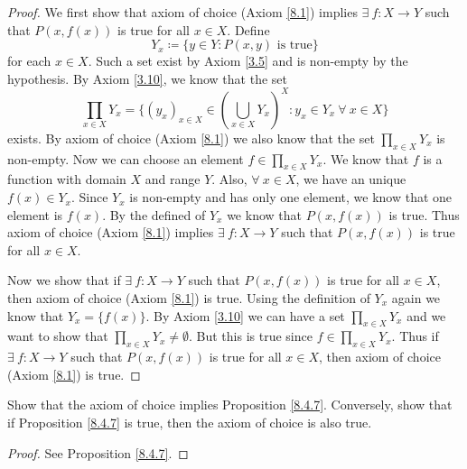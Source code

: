 \begin{proof}
    We first show that axiom of choice (Axiom \ref{8.1}) implies \(\exists\ f : X \to Y\) such that \(P(x, f(x))\) is true for all \(x \in X\).
    Define
    \[
        Y_x \coloneqq \{y \in Y : P(x, y) \text{ is true}\}
    \]
    for each \(x \in X\).
    Such a set exist by Axiom \ref{3.5} and is non-empty by the hypothesis.
    By Axiom \ref{3.10}, we know that the set
    \[
        \prod_{x \in X} Y_x = \Bigg\{(y_x)_{x \in X} \in (\bigcup_{x \in X} Y_x)^X : y_x \in Y_x \ \forall\ x \in X\Bigg\}
    \]
    exists.
    By axiom of choice (Axiom \ref{8.1}) we also know that the set \(\prod_{x \in X} Y_x\) is non-empty.
    Now we can choose an element \(f \in \prod_{x \in X} Y_x\).
    We know that \(f\) is a function with domain \(X\) and range \(Y\).
    Also, \(\forall\ x \in X\), we have an unique \(f(x) \in Y_x\).
    Since \(Y_x\) is non-empty and has only one element, we know that one element is \(f(x)\).
    By the defined of \(Y_x\) we know that \(P(x, f(x))\) is true.
    Thus axiom of choice (Axiom \ref{8.1}) implies \(\exists\ f : X \to Y\) such that \(P(x, f(x))\) is true for all \(x \in X\).

    Now we show that if \(\exists\ f : X \to Y\) such that \(P(x, f(x))\) is true for all \(x \in X\), then axiom of choice (Axiom \ref{8.1}) is true.
    Using the definition of \(Y_x\) again we know that \(Y_x = \{f(x)\}\).
    By Axiom \ref{3.10} we can have a set \(\prod_{x \in X} Y_x\) and we want to show that \(\prod_{x \in X} Y_x \neq \emptyset\).
    But this is true since \(f \in \prod_{x \in X} Y_x\).
    Thus if \(\exists\ f : X \to Y\) such that \(P(x, f(x))\) is true for all \(x \in X\), then axiom of choice (Axiom \ref{8.1}) is true.
\end{proof}

\exercisesection

\begin{exercise}\label{ex 8.4.1}
    Show that the axiom of choice implies Proposition \ref{8.4.7}.
    Conversely, show that if Proposition \ref{8.4.7} is true, then the axiom of choice is also true.
\end{exercise}

\begin{proof}
    See Proposition \ref{8.4.7}.
\end{proof}